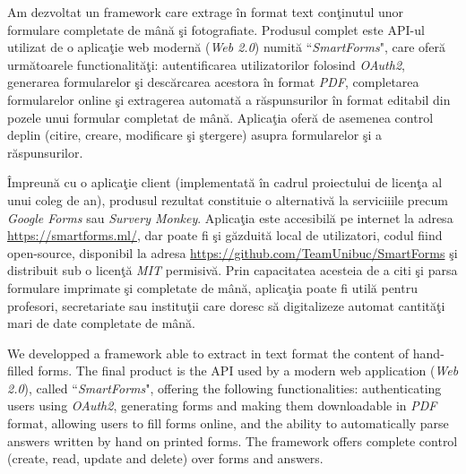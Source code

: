 \documentclass[11pt, a4paper]{report}
\newenvironment{abstractpage}
  {\cleardoublepage\vspace*{\fill}\thispagestyle{empty}}
  {\vfill\cleardoublepage}
\renewenvironment{abstract}[1]
  {\bigskip
  \begin{center}\bfseries\abstractname\end{center}}
  {\par\bigskip}
\begin{document}
\begin{abstractpage}

  \begin{abstract}{}
  Am dezvoltat un framework care extrage \^ in format text con\c tinutul unor formulare completate de m\^an\u a \c si fotografiate.
  Produsul complet este API-ul utilizat de o aplica\c{t}ie web modern\u{a} (\textit{Web 2.0}) numit\u{a} ``\textit{SmartForms}", care ofer\u a urm\u atoarele functionalit\u a\c{t}i: autentificarea utilizatorilor folosind \textit{OAuth2}, generarea formularelor \c{s}i desc\u arcarea acestora \^{i}n format \textit{PDF}, completarea formularelor online \c si extragerea automat\u{a} a r\u aspunsurilor \^ in format editabil din pozele unui formular completat de m\^an\u a. Aplica\c tia ofer\u a de asemenea control deplin (citire, creare, modificare \c si \c{s}tergere) asupra formularelor \c{s}i a r\u{a}spunsurilor.
  
  \^{I}mpreun\u{a} cu o aplica\c{t}ie client (implementat\u{a} \^ in cadrul proiectului de licen\c ta al unui coleg de an), produsul rezultat constituie o alternativ\u a la serviciiile precum \textit{Google Forms} sau \textit{Survery Monkey}. Aplica\c tia este accesibil\u a pe internet la adresa \url{https://smartforms.ml/}, dar poate fi \c si g\u azduit\u a local de utilizatori, codul fiind open-source, disponibil la adresa \url{https://github.com/TeamUnibuc/SmartForms} \c si distribuit sub o licen\c t\u a \textit{MIT} permisiv\u a. Prin capacitatea acesteia de a citi \c si parsa formulare imprimate \c si completate de m\^ an\u a, aplica\c tia poate fi util\u a pentru profesori, secretariate sau institu\c tii care doresc s\u a digitalizeze automat cantit\u a\c ti mari de date completate de m\^an\u a. 
  
  \end{abstract}
  
  \begin{abstract}{}
  
  We developped a framework able to extract in text format the content of hand-filled forms. The final product is the API used by a modern web application (\textit{Web 2.0}), called ``\textit{SmartForms}", offering the following functionalities: authenticating users using \textit{OAuth2}, generating forms and making them downloadable in \textit{PDF} format, allowing users to fill forms online, and the ability to automatically parse answers written by hand on printed forms. The framework offers complete control (create, read, update and delete) over forms and answers.
  

\end{abstract}
\end{abstractpage}
\end{document}
